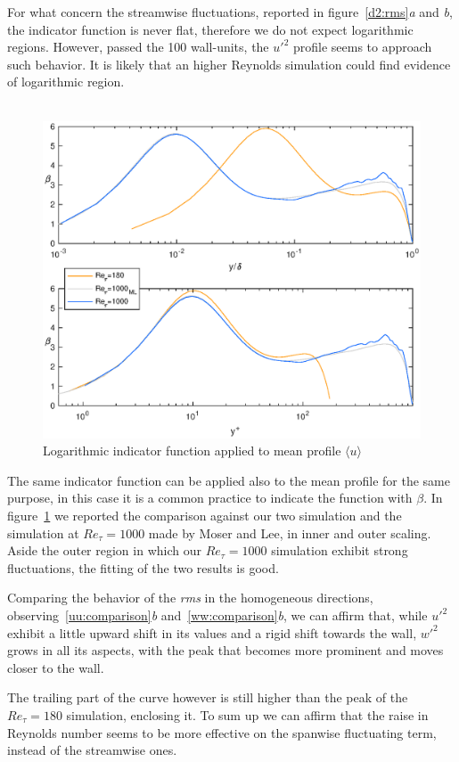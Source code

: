 For what concern the streamwise fluctuations, reported in figure~\ref{d2:rms}\emph{a} and \emph{b}, the indicator function is never flat, therefore we do not expect logarithmic regions. However, passed the 100 wall-units, the $u'^{2}$ profile seems to approach such behavior. It is likely that an higher Reynolds simulation could find evidence of logarithmic region.\\~\par

\begin{figure}
\begin{center}
\includegraphics[scale=0.55]{grafici/towsend.eps}
\caption{Logarithmic indicator function applied to mean profile $\langle u \rangle$}
\label{towsend}
\end{center}
\end{figure}

The same indicator function can be applied also to the mean profile for the same purpose, in this case it is a common practice to indicate the function with $\beta$. In figure~\ref{towsend} we reported the comparison against our two simulation and the simulation at $Re_{\tau}=1000$ made by Moser and Lee, in inner and outer scaling. Aside the outer region in which our $Re_{\tau}=1000$ simulation exhibit strong fluctuations, the fitting of the two results is good.

Comparing the behavior of the \emph{rms} in the homogeneous directions, observing~\ref{uu:comparison}\emph{b} and~\ref{ww:comparison}\emph{b}, we can affirm that, while $u'^{2}$ exhibit a little upward shift in its values and a rigid shift towards the wall, $w'^{2}$ grows in all its aspects, with the peak that becomes more prominent and moves closer to the wall. \par
The trailing part of the curve however is still higher than the peak of the $Re_{\tau}=180$ simulation, enclosing it. To sum up we can affirm that the raise in Reynolds number seems to be more effective on the spanwise fluctuating term, instead of the streamwise ones.\\~\par


